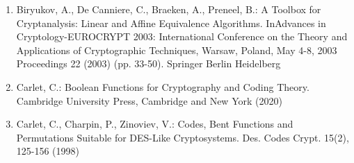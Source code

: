 \documentclass[10pt]{article}
\begin{document}
\begin{enumerate}
  \item Biryukov, A., De Canniere, C., Braeken, A., Preneel, B.: A Toolbox for Cryptanalysis: Linear and Affine Equivalence Algorithms. InAdvances in Cryptology-EUROCRYPT 2003: International Conference on the Theory and Applications of Cryptographic Techniques, Warsaw, Poland, May 4-8, 2003 Proceedings 22 (2003) (pp. 33-50). Springer Berlin Heidelberg
  \item Carlet, C.: Boolean Functions for Cryptography and Coding Theory. Cambridge University Press, Cambridge and New York (2020)
  \item Carlet, C., Charpin, P., Zinoviev, V.: Codes, Bent Functions and Permutations Suitable for DES-Like Cryptosystems. Des. Codes Crypt. 15(2), 125-156 (1998)
\end{enumerate}
\end{document}
